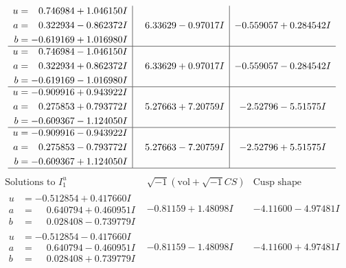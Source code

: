 \documentclass[1p]{elsarticle_modified}
\theoremstyle{definition}
\newcommand{\I}{\sqrt{-1}}
\begin{document}
$$\begin{array}{c|c|c}
\begin{aligned}
u &= \phantom{-}0.746984 + 1.046150 I \\
a &= \phantom{-}0.322934 - 0.862372 I \\
b &= -0.619169 + 1.016980 I\end{aligned}
 & \phantom{-}6.33629 - 0.97017 I & -0.559057 + 0.284542 I \\ \hline\begin{aligned}
u &= \phantom{-}0.746984 - 1.046150 I \\
a &= \phantom{-}0.322934 + 0.862372 I \\
b &= -0.619169 - 1.016980 I\end{aligned}
 & \phantom{-}6.33629 + 0.97017 I & -0.559057 - 0.284542 I \\ \hline\begin{aligned}
u &= -0.909916 + 0.943922 I \\
a &= \phantom{-}0.275853 + 0.793772 I \\
b &= -0.609367 - 1.124050 I\end{aligned}
 & \phantom{-}5.27663 + 7.20759 I & -2.52796 - 5.51575 I \\ \hline\begin{aligned}
u &= -0.909916 - 0.943922 I \\
a &= \phantom{-}0.275853 - 0.793772 I \\
b &= -0.609367 + 1.124050 I\end{aligned}
 & \phantom{-}5.27663 - 7.20759 I & -2.52796 + 5.51575 I\\
 \hline 
 \end{array}$$\newpage$$\begin{array}{c|c|c}  
\text{Solutions to }I^u_{1}& \I (\text{vol} + \sqrt{-1}CS) & \text{Cusp shape}\\
 \hline 
\begin{aligned}
u &= -0.512854 + 0.417660 I \\
a &= \phantom{-}0.640794 + 0.460951 I \\
b &= \phantom{-}0.028408 - 0.739779 I\end{aligned}
 & -0.81159 + 1.48098 I & -4.11600 - 4.97481 I \\ \hline\begin{aligned}
u &= -0.512854 - 0.417660 I \\
a &= \phantom{-}0.640794 - 0.460951 I \\
b &= \phantom{-}0.028408 + 0.739779 I\end{aligned}
 & -0.81159 - 1.48098 I & -4.11600 + 4.97481 I \\ \hline\begin{aligned}

\end{aligned}
\end{array}$$
\end{document}
